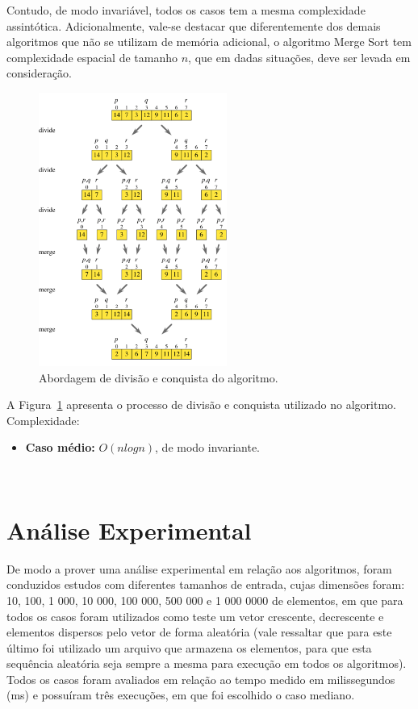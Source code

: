 \documentclass[conference,onecolumn]{IEEEtran}
\begin{document}
Contudo, de modo invariável, todos os casos tem a mesma complexidade assintótica. Adicionalmente, vale-se destacar que diferentemente dos demais algoritmos que não se utilizam de memória adicional, o algoritmo Merge Sort tem complexidade espacial de tamanho $n$, que em dadas situações, deve ser levada em consideração.

\begin{figure}[H]
  
  \centering
    \includegraphics[width=0.55\textwidth]{images/merge.png}
  \caption{Abordagem de divisão e conquista do algoritmo.}
     \label{image:merge}
\end{figure}

A Figura~\ref{image:merge} apresenta o processo de divisão e conquista utilizado no algoritmo.\\

Complexidade:
\begin{itemize}
\item \textbf{Caso médio:} $O (nlog n)$, de modo invariante.
\end{itemize}

~\\
\section{Análise Experimental}

De modo a prover uma análise experimental em relação aos algoritmos, foram conduzidos estudos com diferentes tamanhos de entrada, cujas dimensões foram: 10, 100, 1 000, 10 000, 100 000, 500 000 e 1 000 0000 de elementos, em que para todos os casos foram utilizados como teste um vetor crescente, decrescente e elementos dispersos pelo vetor de forma aleatória (vale ressaltar que para este último foi utilizado um arquivo que armazena os elementos, para que esta sequência aleatória seja sempre a mesma para execução em todos os algoritmos). Todos os casos foram avaliados em relação ao tempo medido em milissegundos (ms) e possuíram três execuções, em que foi escolhido o caso mediano. 
\end{document}
